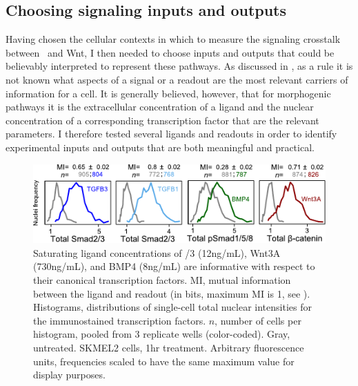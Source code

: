   
\subsection{Choosing signaling inputs and outputs}
\label{insulation:system:inputOutput}


Having chosen the cellular contexts in which to measure
the signaling crosstalk between \tgfbsf\ and Wnt, I then
needed to choose inputs and outputs that
could be believably interpreted to represent these pathways.
As discussed in , as a rule it
is not known what aspects of a signal or a readout are the
most relevant carriers of information for a cell. It is
generally believed, however, that for morphogenic pathways
it is the extracellular concentration of a ligand and the
nuclear concentration of a corresponding transcription factor that
are the relevant parameters. I therefore tested several ligands and readouts
in order to identify experimental inputs and outputs that are
both meaningful and practical.


  \begin{figure}[!bt]
  \centering
  \includegraphics[width=6in]{FIGS/insulation/ligandInformation+.pdf}
  {\singlespacing 
  \caption[Information content of experimental treatments.]
        { Saturating ligand concentrations of /3 (12ng/mL), 
          Wnt3A (730ng/mL),
          and BMP4 (8ng/mL) are informative with respect to
          their canonical
          transcription factors. MI,
          mutual information between the ligand and readout
          (in bits, maximum MI is 1, see ). 
          Histograms, distributions
          of single-cell total nuclear intensities for the
          immunostained transcription factors. $n$, number of cells
          per histogram, pooled from 3 replicate wells 
          (color-coded). Gray, untreated. 
          SKMEL2 cells, 1hr treatment. Arbitrary fluorescence units,
          frequencies scaled to have the same maximum value for display
          purposes.}
  \label{fig:insulation:ligandInformation}}
  \end{figure}
 
